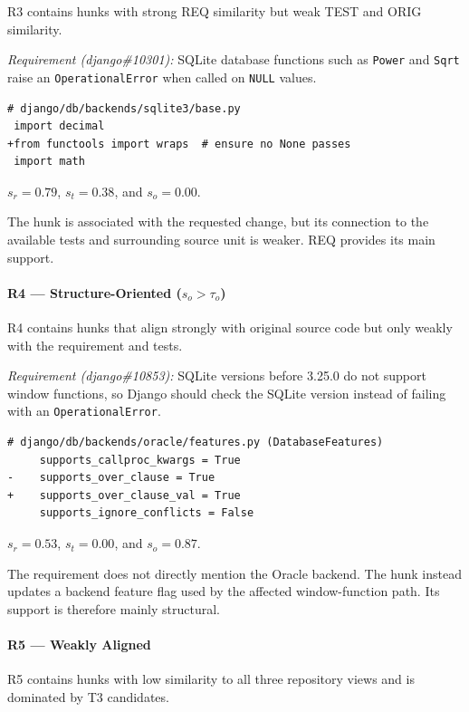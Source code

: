R3 contains hunks with strong REQ similarity but weak TEST and ORIG similarity.

\smallskip
\noindent\textit{Requirement (django\#10301):}
SQLite database functions such as \texttt{Power} and \texttt{Sqrt} raise an \texttt{OperationalError} when called on \texttt{NULL} values.

\begin{lstlisting}
# django/db/backends/sqlite3/base.py
 import decimal
+from functools import wraps  # ensure no None passes
 import math
\end{lstlisting}

\noindent
$s_r=0.79$, $s_t=0.38$, and $s_o=0.00$.

The hunk is associated with the requested change, but its connection to the available tests and surrounding source unit is weaker. REQ provides its main support.

\paragraph{R4 --- Structure-Oriented \textnormal{($s_o>\tau_o$)}}

R4 contains hunks that align strongly with original source code but only weakly with the requirement and tests.

\smallskip
\noindent\textit{Requirement (django\#10853):}
SQLite versions before 3.25.0 do not support window functions, so Django should check the SQLite version instead of failing with an \texttt{OperationalError}.

\begin{lstlisting}
# django/db/backends/oracle/features.py (DatabaseFeatures)
     supports_callproc_kwargs = True
-    supports_over_clause = True
+    supports_over_clause_val = True
     supports_ignore_conflicts = False
\end{lstlisting}

\noindent
$s_r=0.53$, $s_t=0.00$, and $s_o=0.87$.

The requirement does not directly mention the Oracle backend. The hunk instead updates a backend feature flag used by the affected window-function path. Its support is therefore mainly structural.

\paragraph{R5 --- Weakly Aligned}

R5 contains hunks with low similarity to all three repository views and is dominated by T3 candidates.

